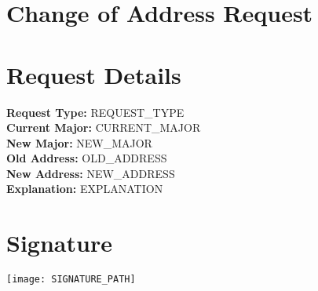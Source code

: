\documentclass{article}
\begin{document}
\section*{Change of Address Request}
\date{\today}

\maketitle



\section*{Request Details}
\textbf{Request Type:} REQUEST_TYPE \\
\textbf{Current Major:} CURRENT_MAJOR \\
\textbf{New Major:} NEW_MAJOR \\
\textbf{Old Address:} OLD_ADDRESS \\
\textbf{New Address:} NEW_ADDRESS \\
\textbf{Explanation:} EXPLANATION

\section*{Signature}
\vspace{1cm}
\texttt{[image: SIGNATURE\_PATH]} %
\end{document}

